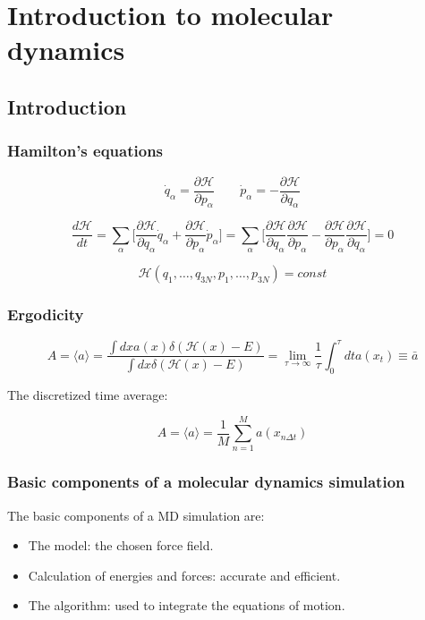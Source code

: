 \chapter{Introduction to molecular dynamics}

\section{Introduction}

	\subsection{Hamilton's equations}

	$$\dot{q}_\alpha = \frac{\partial\mathcal{H}}{\partial p_\alpha}\qquad\dot{p}_\alpha = - \frac{\partial\mathcal{H}}{\partial q_\alpha}$$

	$$\frac{d\mathcal{H}}{dt} = \sum\limits_\alpha\biggl[\frac{\partial\mathcal{H}}{\partial q_\alpha}\dot{q}_\alpha + \frac{\partial\mathcal{H}}{\partial p_\alpha}\dot{p}_\alpha\biggr] = \sum\limits_\alpha\biggl[\frac{\partial\mathcal{H}}{\partial q_\alpha}\frac{\partial\mathcal{H}}{\partial p_\alpha}-\frac{\partial\mathcal{H}}{\partial p_\alpha}\frac{\partial\mathcal{H}}{\partial q_\alpha}\biggr] = 0$$

	$$\mathcal{H}(q_1, \dots, q_{3N}, p_1, \dots, p_{3N}) = const$$

	\subsection{Ergodicity}

	$$A = \langle a\rangle = \frac{\int dxa(x)\delta(\mathcal{H}(x)-E)}{\int dx\delta(\mathcal{H}(x)-E)} = \lim\limits_{\tau\rightarrow\infty}\frac{1}{\tau}\int_0^\tau dta(x_t)\equiv\bar{a}$$

	The discretized time average:

	$$A = \langle a\rangle = \frac{1}{M}\sum\limits_{n=1}^M a(x_{n\Delta t})$$

	\subsection{Basic components of a molecular dynamics simulation}
	The basic components of a MD simulation are:

	\begin{multicols}{2}
		\begin{itemize}
			\item The model: the chosen force field.
			\item Calculation of energies and forces: accurate and efficient.
			\item The algorithm: used to integrate the equations of motion.
		\end{itemize}
	\end{multicols}

